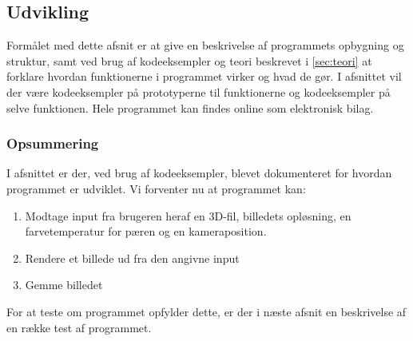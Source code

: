 \subsection{Udvikling}
Formålet med dette afsnit er at give en beskrivelse af programmets opbygning og struktur, samt ved brug af kodeeksempler og teori beskrevet i \ref{sec:teori} at forklare hvordan funktionerne i programmet virker og hvad de gør. I afsnittet vil der være kodeeksempler på prototyperne til funktionerne og kodeeksempler på selve funktionen. Hele programmet kan findes online som elektronisk bilag.







\subsubsection*{Opsummering}

I afsnittet er der, ved brug af kodeeksempler, blevet dokumenteret for hvordan programmet er udviklet. Vi forventer nu at programmet kan:

\begin{enumerate}
    \item Modtage input fra brugeren heraf en 3D-fil, billedets opløsning, en farvetemperatur for pæren og en kameraposition.
    \item Rendere et billede ud fra den angivne input
    \item Gemme billedet
\end{enumerate}

For at teste om programmet opfylder dette, er der i næste afsnit en beskrivelse af en række test af programmet.
